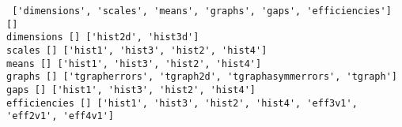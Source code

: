 \begin{footnotesize}
\begin{verbatim}
 ['dimensions', 'scales', 'means', 'graphs', 'gaps', 'efficiencies'] []
dimensions [] ['hist2d', 'hist3d']
scales [] ['hist1', 'hist3', 'hist2', 'hist4']
means [] ['hist1', 'hist3', 'hist2', 'hist4']
graphs [] ['tgrapherrors', 'tgraph2d', 'tgraphasymmerrors', 'tgraph']
gaps [] ['hist1', 'hist3', 'hist2', 'hist4']
efficiencies [] ['hist1', 'hist3', 'hist2', 'hist4', 'eff3v1', 'eff2v1', 'eff4v1']
\end{verbatim}
\end{footnotesize}
